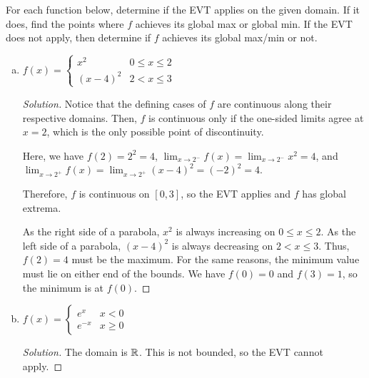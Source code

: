 \question For each function below, determine if the EVT applies on the given domain.
If it does, find the points where $f$ achieves its global max or global min.
If the EVT does not apply, then determine if $f$ achieves its global max/min or not.
\begin{enumerate}[(a)]
  \item $f(x)=\begin{cases}
            x^2     & 0 \leq x \leq 2 \\
            (x-4)^2 & 2 < x \leq 3
          \end{cases}$
        \begin{proof}[Solution]
          Notice that the defining cases of $f$ are continuous along their respective domains.
          Then, $f$ is continuous only if the one-sided limits agree at $x=2$,
          which is the only possible point of discontinuity.

          Here, we have $f(2) = 2^2 = 4$, $\lim_{x\to2^-}f(x)=\lim_{x\to2^-}x^2=4$,
          and $\lim_{x\to2^+}f(x)=\lim_{x\to2^+}(x-4)^2=(-2)^2=4$.

          Therefore, $f$ is continuous on $[0,3]$, so the EVT applies and $f$ has global extrema.

          As the right side of a parabola, $x^2$ is always increasing on $0 \leq x \leq 2$.
          As the left side of a parabola, $(x-4)^2$ is always decreasing on $2 < x \leq 3$.
          Thus, $f(2)=4$ must be the maximum.
          For the same reasons, the minimum value must lie on either end of the bounds.
          We have $f(0) = 0$ and $f(3) = 1$, so the minimum is at $f(0)$.
        \end{proof}
  \item $f(x)=\begin{cases}
            e^x    & x < 0    \\
            e^{-x} & x \geq 0
          \end{cases}$
        \begin{proof}[Solution]
          The domain is $\mathbb{R}$.
          This is not bounded, so the EVT cannot apply.


\end{proof}
\end{enumerate}
